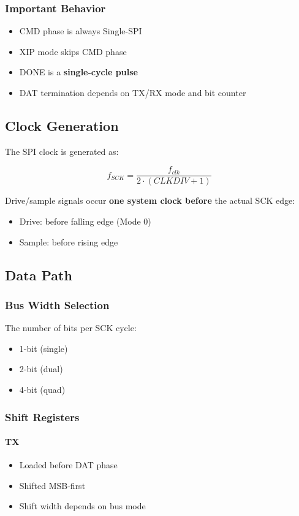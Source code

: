 \subsubsection{Important Behavior}

\begin{itemize}
  \item CMD phase is always Single-SPI
  \item XIP mode skips CMD phase
  \item DONE is a \textbf{single-cycle pulse}
  \item DAT termination depends on TX/RX mode and bit counter
\end{itemize}

\subsection{Clock Generation}

The SPI clock is generated as:

\[
f_{SCK} = \frac{f_{clk}}{2 \cdot (CLKDIV + 1)}
\]

Drive/sample signals occur \textbf{one system clock before} the actual SCK edge:
\begin{itemize}
  \item Drive: before falling edge (Mode 0)
  \item Sample: before rising edge
\end{itemize}

\subsection{Data Path}

\subsubsection{Bus Width Selection}

The number of bits per SCK cycle:
\begin{itemize}
  \item 1-bit (single)
  \item 2-bit (dual)
  \item 4-bit (quad)
\end{itemize}

\subsubsection{Shift Registers}

\paragraph{TX}
\begin{itemize}
  \item Loaded before DAT phase
  \item Shifted MSB-first
  \item Shift width depends on bus mode
\end{itemize}

